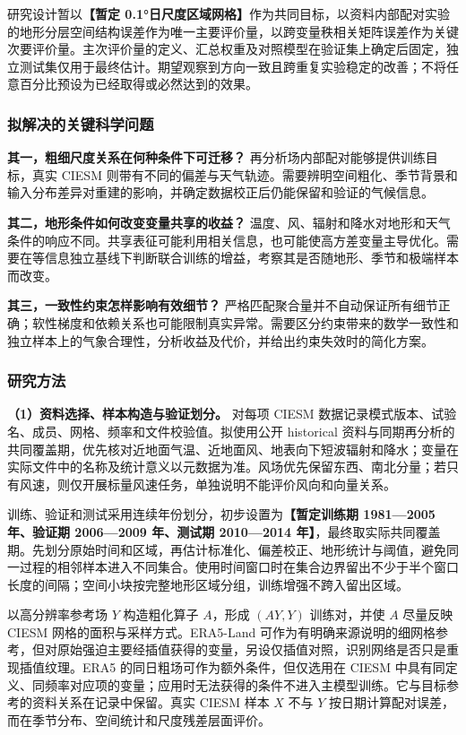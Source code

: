 研究设计暂以\textbf{【暂定 0.1°日尺度区域网格】}作为共同目标，以资料内部配对实验的地形分层空间结构误差作为唯一主要评价量，以跨变量秩相关矩阵误差作为关键次要评价量。主次评价量的定义、汇总权重及对照模型在验证集上确定后固定，独立测试集仅用于最终估计。期望观察到方向一致且跨重复实验稳定的改善；不将任意百分比预设为已经取得或必然达到的效果。

\subsubsection{拟解决的关键科学问题}

\textbf{其一，粗细尺度关系在何种条件下可迁移？}
再分析场内部配对能够提供训练目标，真实 CIESM 则带有不同的偏差与天气轨迹。需要辨明空间粗化、季节背景和输入分布差异对重建的影响，并确定数据校正后仍能保留和验证的气候信息。

\textbf{其二，地形条件如何改变变量共享的收益？}
温度、风、辐射和降水对地形和天气条件的响应不同。共享表征可能利用相关信息，也可能使高方差变量主导优化。需要在等信息独立基线下判断联合训练的增益，考察其是否随地形、季节和极端样本而改变。

\textbf{其三，一致性约束怎样影响有效细节？}
严格匹配聚合量并不自动保证所有细节正确；软性梯度和依赖关系也可能限制真实异常。需要区分约束带来的数学一致性和独立样本上的气象合理性，分析收益及代价，并给出约束失效时的简化方案。

\subsubsection{研究方法}

\textbf{（1）资料选择、样本构造与验证划分。}
对每项 CIESM 数据记录模式版本、试验名、成员、网格、频率和文件校验值。拟使用公开 historical 资料与同期再分析的共同覆盖期，优先核对近地面气温、近地面风、地表向下短波辐射和降水；变量在实际文件中的名称及统计意义以元数据为准。风场优先保留东西、南北分量；若只有风速，则仅开展标量风速任务，单独说明不能评价风向和向量关系。

训练、验证和测试采用连续年份划分，初步设置为\textbf{【暂定训练期 1981—2005 年、验证期 2006—2009 年、测试期 2010—2014 年】}，最终取实际共同覆盖期。先划分原始时间和区域，再估计标准化、偏差校正、地形统计与阈值，避免同一过程的相邻样本进入不同集合。使用时间窗口时在集合边界留出不少于半个窗口长度的间隔；空间小块按完整地形区域分组，训练增强不跨入留出区域。

以高分辨率参考场 $Y$ 构造粗化算子 $A$，形成 $(AY,Y)$ 训练对，并使 $A$ 尽量反映 CIESM 网格的面积与采样方式。ERA5-Land 可作为有明确来源说明的细网格参考，但对原始强迫主要经插值获得的变量，另设仅插值对照，识别网络是否只是重现插值纹理。ERA5 的同日粗场可作为额外条件，但仅选用在 CIESM 中具有同定义、同频率对应项的变量；应用时无法获得的条件不进入主模型训练。它与目标参考的资料关系在记录中保留。真实 CIESM 样本 $X$ 不与 $Y$ 按日期计算配对误差，而在季节分布、空间统计和尺度残差层面评价。

